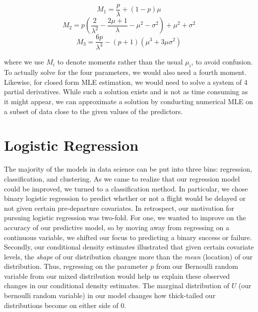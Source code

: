 \documentclass[12pt, a4paper, openany]{book}
\newcommand\tab[1][1cm]{\hspace*{#1}}
\begin{document}
	\begin{center}
	$$M_1 = \frac{p}{\lambda} +(1- p)\mu$$
	$$M_2 = p\left(\frac{2}{\lambda^2} - \frac{2\mu+1}{\lambda} - \mu^2 - \sigma^2\right) +\mu^2 +\sigma^2$$
	$$M_3 = \frac{6p}{\lambda^3} -(p+1)(\mu^3 + 3\mu\sigma^2) $$
	\end{center} 
	where we use $M_i$ to denote moments rather than the usual $\mu_i$, to avoid confusion. To actually solve for the four parameters, we would also need a fourth moment. Likewise, for closed form MLE estimation, we would need to solve a system of 4 partial derivatives. While such a solution exists and is not as time consuming as it might appear, we can approximate a solution by conducting numerical MLE on a subset of data close to the given values of the predictors. 
	\section{Logistic Regression}
	\tab The majority of the models in data science can be put into three bins: regression, classification, and clustering. As we came to realize that our regression model could be improved, we turned to a classification method. In particular, we chose binary logistic regression to predict whether or not a flight would be delayed or not given certain pre-departure covariates. In retrospect, our motivation for pursuing logistic regression was two-fold. For one, we wanted to improve on the accuracy of our predictive model, so by moving away from regressing on a continuous variable, we shifted our focus to predicting a binary success or failure. Secondly, our conditional density estimates illustrated that given certain covariate levels, the \textit{shape} of our distribution changes more than the \textit{mean} (location) of our distribution. Thus, regressing on the parameter $p$ from our Bernoulli random variable from our mixed distribution would help us explain these observed changes in our conditional density estimates. The marginal distribution of $U$ (our bernoulli random variable) in our model changes how thick-tailed our distributions become on either side of 0. \\
\end{document}
